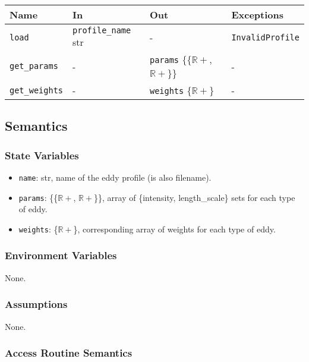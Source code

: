 \documentclass[12pt, titlepage]{article}
\begin{document}
\begin{center}
\begin{tabular}{p{2.5cm} p{3.5cm} p{5cm} p{4cm}}
\hline
\textbf{Name} & \textbf{In} & \textbf{Out} & \textbf{Exceptions} \\
\hline
\texttt{load} & \texttt{profile\_name} str & - & \texttt{InvalidProfile} \\
\texttt{get\_params}& - & \texttt{params} \{{\{$\mathbb{R+}$, $\mathbb{R+}$\}}\} & - \\
\texttt{get\_weights}& - & \texttt{weights} \{$\mathbb{R+}$\} & - \\
\hline
\end{tabular}
\end{center}

\subsection{Semantics}

\subsubsection{State Variables}
\begin{itemize}
  \item \texttt{name}: str, name of the eddy profile (is also filename).
  \item \texttt{params}: \{{\{$\mathbb{R+}$, $\mathbb{R+}$\}}\}, array of \{intensity, length\_scale\} sets for each type of eddy.
  \item \texttt{weights}: \{$\mathbb{R+}$\}, corresponding array of weights for each type of eddy.
\end{itemize}

\subsubsection{Environment Variables}
None.

\subsubsection{Assumptions}
None.

\subsubsection{Access Routine Semantics}
\end{document}
